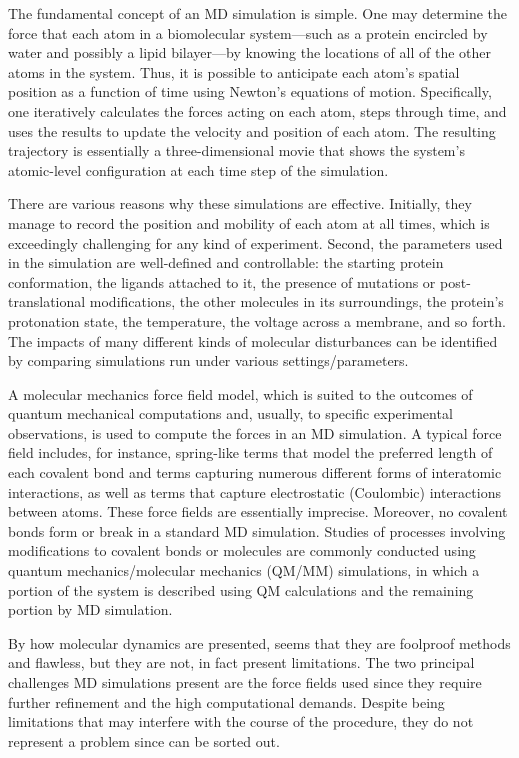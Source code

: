 \documentclass[12pt,twoside]{article}
\begin{document}
The fundamental concept of an MD simulation is simple. One may determine the force that each atom in a biomolecular system—such as a protein encircled by water and possibly a lipid bilayer—by knowing the locations of all of the other atoms in the system. Thus, it is possible to anticipate each atom's spatial position as a function of time using Newton's equations of motion. Specifically, one iteratively calculates the forces acting on each atom, steps through time, and uses the results to update the velocity and position of each atom. The resulting trajectory is essentially a three-dimensional movie that shows the system's atomic-level configuration at each time step of the simulation.\cite{hollingsworth_molecular_2018}

There are various reasons why these simulations are effective. Initially, they manage to record the position and mobility of each atom at all times, which is exceedingly challenging for any kind of experiment. Second, the parameters used in the simulation are well-defined and controllable: the starting protein conformation, the ligands attached to it, the presence of mutations or post-translational modifications, the other molecules in its surroundings, the protein's protonation state, the temperature, the voltage across a membrane, and so forth. The impacts of many different kinds of molecular disturbances can be identified by comparing simulations run under various settings/parameters.

A molecular mechanics force field model, which is suited to the outcomes of quantum mechanical computations and, usually, to specific experimental observations, is used to compute the forces in an MD simulation. A typical force field includes, for instance, spring-like terms that model the preferred length of each covalent bond and terms capturing numerous different forms of interatomic interactions, as well as terms that capture electrostatic (Coulombic) interactions between atoms. These force fields are essentially imprecise. Moreover, no covalent bonds form or break in a standard MD simulation. Studies of processes involving modifications to covalent bonds or molecules are commonly conducted using quantum mechanics/molecular mechanics (QM/MM) simulations, in which a portion of the system is described using QM calculations and the remaining portion by MD simulation. \cite{hollingsworth_molecular_2018}

By how molecular dynamics are presented, seems that they are foolproof methods and flawless, but they are not, in fact present limitations. The two principal challenges MD simulations present are the force fields used since they require further refinement and the high computational demands. Despite being limitations that may interfere with the course of the procedure, they do not represent a problem since can be sorted out.\cite{durrant_molecular_2011}
\end{document}
